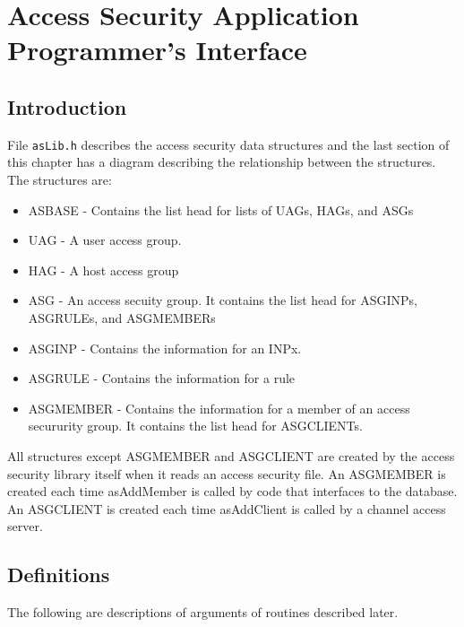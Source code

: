\section{Access Security Application Programmer's Interface}

\subsection{Introduction}

File \verb|asLib.h| describes the access security data structures and the last section of this chapter has a diagram describing 
the relationship between the structures. The structures are:

\begin{itemize}
\item ASBASE - Contains the list head for lists of UAGs, HAGs, and ASGs

\item UAG - A user access group.

\item HAG - A host access group

\item ASG - An access secuity group. It contains the list head for ASGINPs, ASGRULEs, and ASGMEMBERs

\item ASGINP - Contains the information for an INPx.

\item ASGRULE - Contains the information for a rule

\item ASGMEMBER - Contains the information for a member of an access secururity group. It contains the list head for 
ASGCLIENTs.

\end{itemize}

All structures except ASGMEMBER and ASGCLIENT are created by the access security library itself  when it reads an 
access security file. An ASGMEMBER is created each time asAddMember is called by code that interfaces to the 
database. An ASGCLIENT is created each time asAddClient is called by a channel access server.

\subsection{Definitions}

The following are descriptions of arguments of routines described later.

